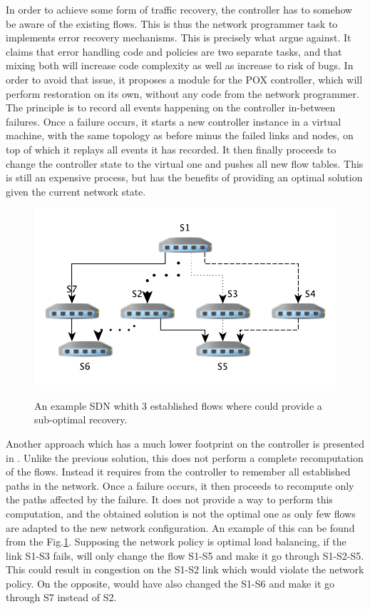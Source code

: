 \documentclass[]{IEEEtran}
\begin{document}
In order to achieve some form of traffic recovery, the controller has to somehow be aware of the existing flows. This is thus the network programmer task to implements error recovery mechanisms. This is precisely what \cite{Kuzniar:2013:AFR:2491185.2491218} argue against. It claims that error handling code and policies are two separate tasks, and that mixing both will increase code complexity as well as increase to risk of bugs. In order to avoid that issue, it proposes a module for the POX controller, which will perform restoration on its own, without any code from the network programmer. The principle is to record all events happening on the controller in-between failures. Once a failure occurs, it starts a new controller instance in a virtual machine, with the same topology as before minus the failed links and nodes, on top of which it replays all events it has recorded. It then finally proceeds to change the controller state to the virtual one and pushes all new flow tables. This is still an expensive process, but has the benefits of providing an optimal solution given the current network state.

\begin{figure}
	\includegraphics[width=.5\textwidth]{images/enabling_failures.pdf}
	\label{fig:failures}
	\caption{An example SDN whith 3 established flows where \cite{2911632} could provide a sub-optimal recovery.}
\end{figure}

Another approach which has a much lower footprint on the controller is presented in \cite{2911632}. Unlike the previous solution, this does not perform a complete recomputation of the flows. Instead it requires from the controller to remember all established paths in the network. Once a failure occurs, it then proceeds to recompute only the paths affected by the failure. It does not provide a way to perform this computation, and the obtained solution is not the optimal one as only few flows are adapted to the new network configuration. An example of this can be found from the Fig.\ref{fig:failures}. Supposing the network policy is optimal load balancing, if the link S1-S3 fails, \cite{2911632} will only change the flow S1-S5 and make it go through S1-S2-S5. This could result in congestion on the S1-S2 link which would violate the network policy. On the opposite, \cite{Kuzniar:2013:AFR:2491185.2491218} would have also changed the S1-S6 and make it go through S7 instead of S2.
\end{document}
